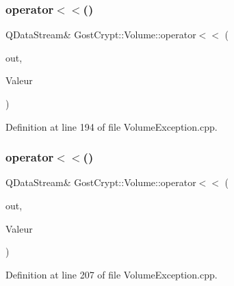 \subsubsection{\texorpdfstring{operator$<$$<$()}{operator<<()}\hspace{0.1cm}{\footnotesize\ttfamily [14/19]}}
{\footnotesize\ttfamily Q\+Data\+Stream\& Gost\+Crypt\+::\+Volume\+::operator$<$$<$ (\begin{DoxyParamCaption}\item[{Q\+Data\+Stream \&}]{out,  }\item[{const \hyperlink{class_gost_crypt_1_1_volume_1_1_failed_reset_timestamps}{Gost\+Crypt\+::\+Volume\+::\+Failed\+Reset\+Timestamps} \&}]{Valeur }\end{DoxyParamCaption})}



Definition at line 194 of file Volume\+Exception.\+cpp.

\mbox{\label{namespace_gost_crypt_1_1_volume_a58a84ba282215833ee77ab809469f80f}} 
\subsubsection{\texorpdfstring{operator$<$$<$()}{operator<<()}\hspace{0.1cm}{\footnotesize\ttfamily [15/19]}}
{\footnotesize\ttfamily Q\+Data\+Stream\& Gost\+Crypt\+::\+Volume\+::operator$<$$<$ (\begin{DoxyParamCaption}\item[{Q\+Data\+Stream \&}]{out,  }\item[{const \hyperlink{class_gost_crypt_1_1_volume_1_1_volume_version_not_compatible}{Gost\+Crypt\+::\+Volume\+::\+Volume\+Version\+Not\+Compatible} \&}]{Valeur }\end{DoxyParamCaption})}



Definition at line 207 of file Volume\+Exception.\+cpp.

\mbox{\label{namespace_gost_crypt_1_1_volume_a78768b201e4b15037324f04a31d48382}} 
